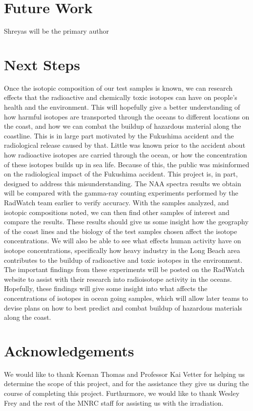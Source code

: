 \documentclass[]{article}
\begin{document}
\section{Future Work}
Shreyas will be the primary author


\section{Next Steps}
  
Once the isotopic composition of our test samples is known, we can research effects that the radioactive and chemically toxic isotopes can have on people’s health and the environment. This will hopefully give a better understanding of how harmful isotopes are transported through the oceans to different locations on the coast, and how we can combat the buildup of hazardous material along the coastline. This is in large part motivated by the Fukushima accident and the radiological release caused by that. Little was known prior to the accident about how radioactive isotopes are carried through the ocean, or how the concentration of these isotopes builds up in sea life. Because of this, the public was misinformed on the radiological impact of the Fukushima accident. This project is, in part, designed to address this misunderstanding. The NAA spectra results we obtain will be compared with the gamma-ray counting experiments performed by the RadWatch team earlier to verify accuracy. With the samples analyzed, and isotopic compositions noted, we can then find other samples of interest and compare the results. These results should give us some insight how the geography of the coast lines and the biology of the test samples chosen affect the isotope concentrations. We will also be able to see what effects human activity have on isotope concentrations, specifically how heavy industry in the Long Beach area contributes to the buildup of radioactive and toxic isotopes in the environment. The important findings from these experiments will be posted on the RadWatch website to assist with their research into radioisotope activity in the oceans. Hopefully, these findings will give some insight into what affects the concentrations of isotopes in ocean going samples, which will allow later teams to devise plans on how to best predict and combat buildup of hazardous materials along the coast. 

\section{Acknowledgements}

We would like to thank Keenan Thomas and Professor Kai Vetter for helping us determine the scope of this project, and for the assistance they give us during the course of completing this project. Furthurmore, we would like to thank Wesley Frey and the rest of the MNRC staff for assisting us with the irradiation.
\end{document}
